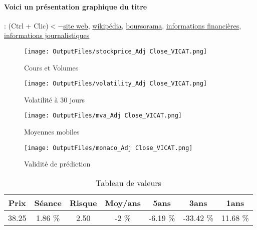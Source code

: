 \documentclass[11pt,a4paper]{report}%
\begin{document}
\paragraph{Voici un présentation graphique du titre} : (Ctrl + Clic)$<-$\href{https://www.vicat.fr/accueil-investisseurs}{site web}, \href{https://fr.wikipedia.org/wiki/Vicat_(entreprise)}{wikipédia}, \href{https://www.boursorama.com/cours/1rPVCT}{boursorama}, \href{https://www.qwant.com/?q=site:https:%2f%2fwww.easybourse.com%2faction-societe%2fVICAT&t=web&client=ext-firefox-hp}{informations financières}, \href{https://bourse.lerevenu.com/cours-de-bourse/fiche-valeur-synthese/VICAT/VCT-FR}{informations journalistiques}
\begin{figure}[!htb]
   \begin{minipage}{0.5\textwidth}
     \centering
     \texttt{[image: OutputFiles/stockprice\_Adj Close\_VICAT.png]}
     \caption{Cours et Volumes}\label{Fig:price_VICAT}
   \end{minipage}\hfill
   \begin{minipage}{0.5\textwidth}
     \centering
     \texttt{[image: OutputFiles/volatility\_Adj Close\_VICAT.png]}
     \caption{Volatilité à 30 jours}\label{Fig:volat_VICAT}
   \end{minipage}
\end{figure}
\begin{figure}[!htb]
   \begin{minipage}{0.5\textwidth}
     \centering
     \texttt{[image: OutputFiles/mva\_Adj Close\_VICAT.png]}
     \caption{Moyennes mobiles}\label{Fig:mva_VICAT}
   \end{minipage}\hfill
   \begin{minipage}{0.5\textwidth}
     \centering
     \texttt{[image: OutputFiles/monaco\_Adj Close\_VICAT.png]}
     \caption{Validité de prédiction}\label{Fig:prediction_VICAT}
   \end{minipage}
\end{figure}

\begin{table}[H]
  \centering
    \begin{tabular}{|c|c|c|c|c|c|c|}
    \hline
    Prix & Séance & Risque  & Moy/ans & 5ans & 3ans & 1ans \\
    \hline
    38.25 &    1.86 \%    & 2.50 & -2 \% & -6.19 \% & -33.42 \% & 11.68 \% \\
    \hline
    \end{tabular}%
        \label{tab:table_VICAT}%
      \caption{Tableau de valeurs}
\end{table}%
\end{document}
